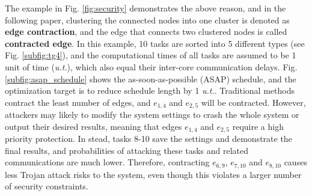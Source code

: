 \documentclass[10pt,journal]{IEEEtran}
\begin{document}
The example in Fig. \ref{fig:security} demonstrates the above reason, and in the following paper, clustering the connected nodes into one cluster is denoted as \textbf{edge contraction}, and the edge that connects two clustered nodes is called \textbf{contracted edge}. In this example, 10 tasks are sorted into 5 different types (see Fig. \ref{subfig:tg4}), and the computational times of all tasks are assumed to be 1 unit of time (\textit{u.t.}), which also equal their inter-core communication delays. Fig. \ref{subfig:asap_schedule} shows the as-soon-as-possible (ASAP) schedule, and the optimization target is to reduce schedule length by 1 \textit{u.t.}. Traditional methods \cite{article:NW} contract the least number of edges, and $e_{1,4}$ and $e_{2,5}$ will be contracted. However, attackers may likely to modify the system settings to crash the whole system or output their desired results, meaning that edges $e_{1,4}$ and $e_{2,5}$ require a high priority protection. In stead, tasks 8-10 save the settings and demonstrate the final results, and probabilities of attacking these tasks and related communications are much lower. Therefore, contracting $e_{6,9}$, $e_{7,10}$ and $e_{8,10}$ causes less Trojan attack risks to the system, even though this violates a larger number of security constraints.
\end{document}
